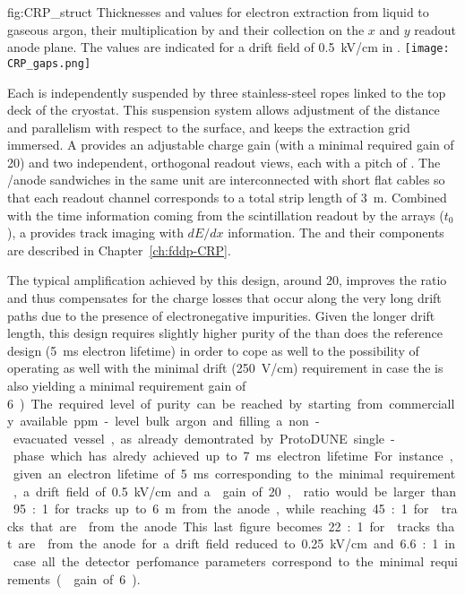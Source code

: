 \begin{dunefigure}{fig:CRP_struct}
{Thicknesses and  values for electron extraction from liquid to gaseous argon, their  multiplication by  and their collection on the $x$ and $y$ readout anode plane. The  values are indicated for a drift field of \SI{0.5}{kV/cm} in \lar.}
\texttt{[image: CRP\_gaps.png]}
\end{dunefigure}

Each  is independently suspended by three stainless-steel ropes linked to the top deck of the cryostat. This suspension system allows adjustment of the  distance and parallelism with respect to the \lar surface, and keeps the extraction grid immersed. A  provides an adjustable charge gain (with a minimal required gain of \num{20}) and two independent, orthogonal readout views, each with a pitch of \dpstrippitch.  The /anode sandwiches  in the same  unit are interconnected with short flat cables so that each readout channel corresponds to a total strip length of \SI{3}{m}. Combined with the time information coming from the \lar scintillation readout by the  arrays ($t_0$), a  provides \threed track imaging with $dE/dx$ information.  The  and their components are described in Chapter~\ref{ch:fddp-CRP}.

The typical amplification achieved by this design, around 20, improves the  ratio and thus compensates for the charge losses that occur along the very long drift paths due to the presence of  electronegative impurities. Given the longer drift length, this design requires slightly higher purity of the \lar than does the reference design  (\SI{5}{ms} electron lifetime) in order to cope as well to the possibility of operating as well with the minimal drift \efield (\SI{250}{V/cm}) requirement in case the  is also yielding a minimal requirement gain of \SI{6}). The required level of purity can be reached by starting from  commercially available ppm-level bulk argon and filling a non-evacuated vessel, as already demontrated by ProtoDUNE single-phase which has alredy achieved up to \SI{7}{ms} electron lifetime.

For instance, given an electron lifetime of \SI{5}{ms} corresponding to the minimal requirement,  a drift field of \SI{0.5}{kV/cm} and a  gain of \num{20},  ratio would be larger than  \num{95}:\num{1} for tracks up to \SI{6}{m} from the anode, while reaching  \num{45}:\num{1} for   tracks that are \dpmaxdrift from the anode. This last figure becomes  \num{22}:\num{1} for   tracks that are \dpmaxdrift from the anode for a drift field reduced to  \SI{0.25}{kV/cm} and \num{6.6}:\num{1} in case all the detector perfomance parameters correspond to the minimal requirements ( gain of  \SI{6}).

